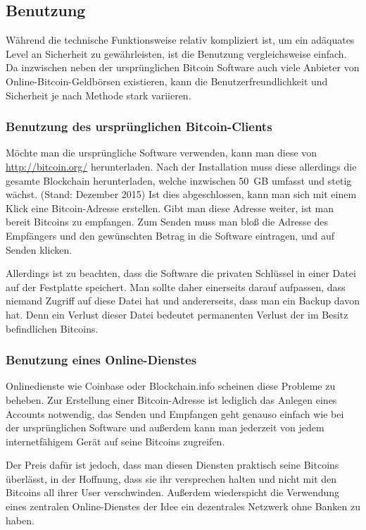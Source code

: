 \subsection{Benutzung}

Während die technische Funktionsweise relativ kompliziert ist, um ein adäquates Level an Sicherheit zu gewährleisten, ist die Benutzung vergleichsweise einfach.
Da inzwischen neben der ursprünglichen Bitcoin Software auch viele Anbieter von Online-Bitcoin-Geldbörsen existieren, kann die Benutzerfreundlichkeit und Sicherheit je nach Methode stark variieren.

\subsubsection{Benutzung des ursprünglichen Bitcoin-Clients}

Möchte man die ursprüngliche Software verwenden, kann man diese von \url{http://bitcoin.org/} herunterladen.
Nach der Installation muss diese allerdings die gesamte Blockchain herunterladen, welche inzwischen 50~GB umfasst und stetig wächst. (Stand: Dezember 2015)
Ist dies abgeschlossen, kann man sich mit einem Klick eine Bitcoin-Adresse erstellen.
Gibt man diese Adresse weiter, ist man bereit Bitcoins zu empfangen.
Zum Senden muss man bloß die Adresse des Empfängers und den gewünschten Betrag in die Software eintragen, und auf Senden klicken.

Allerdings ist zu beachten, dass die Software die privaten Schlüssel in einer Datei auf der Festplatte speichert.
Man sollte daher einerseits darauf aufpassen, dass niemand Zugriff auf diese Datei hat und andererseits, dass man ein Backup davon hat.
Denn ein Verlust dieser Datei bedeutet permanenten Verlust der im Besitz befindlichen Bitcoins.

\subsubsection{Benutzung eines Online-Dienstes}

Onlinedienste wie Coinbase oder Blockchain.info scheinen diese Probleme zu beheben.
Zur Erstellung einer Bitcoin-Adresse ist lediglich das Anlegen eines Accounts notwendig, das Senden und Empfangen geht genauso einfach wie bei der ursprünglichen Software und außerdem kann man jederzeit von jedem internetfähigem Gerät auf seine Bitcoins zugreifen.

Der Preis dafür ist jedoch, dass man diesen Diensten praktisch seine Bitcoins überlässt, in der Hoffnung, dass sie ihr versprechen halten und nicht mit den Bitcoins all ihrer User verschwinden.
Außerdem wiederspicht die Verwendung eines zentralen Online-Dienstes der Idee ein dezentrales Netzwerk ohne Banken zu haben.
